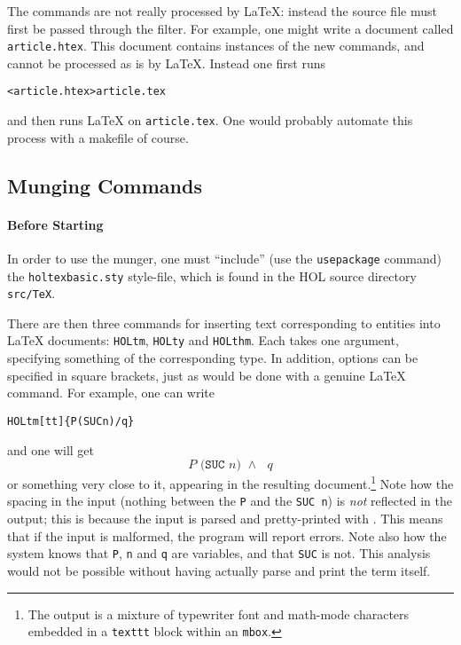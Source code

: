 The commands are not really processed by \LaTeX{}: instead the source file must first be passed through the \munge{} filter.
%
For example, one might write a document called \texttt{article.htex}.
%
This document contains instances of the new commands, and cannot be processed as is by \LaTeX{}.
%
Instead one first runs
\begin{alltt}
   \munge < article.htex > article.tex
\end{alltt}
and then runs \LaTeX{} on \texttt{article.tex}.
%
One would probably automate this process with a makefile of course.

\subsection{Munging Commands}
\label{sec:munging-commands}
\newcommand{\holtm}{\texttt{\bs{}HOLtm}}
\newcommand{\holty}{\texttt{\bs{}HOLty}}
\newcommand{\holthm}{\texttt{\bs{}HOLthm}}
\paragraph{Before Starting} In order to use the munger, one must ``include'' (use the \texttt{\bs{}usepackage} command) the \texttt{holtexbasic.sty} style-file, which is found in the HOL source directory \texttt{src/TeX}.

\bigskip
There are then three commands for inserting text corresponding to \HOL{} entities into \LaTeX{} documents: \holtm, \holty{} and \holthm.
%
Each takes one argument, specifying something of the corresponding \HOL{} type.
%
In addition, options can be specified in square brackets, just as would be done with a genuine \LaTeX{} command.
%
For example, one can write
\begin{alltt}
   \holtm{}[tt]\{P(SUC n) /\bs{} q\}
\end{alltt}
and one will get \[
  \texttt{$P$ (SUC $n$) $\land$ $q$}
\]
or something very close to it, appearing in the resulting document.\footnote{The output is a mixture of typewriter font and math-mode characters embedded in a \texttt{\bs{}texttt} block within an \texttt{\bs{}mbox}.}
%
Note how the spacing in the input (nothing between the \texttt{P} and the \texttt{SUC n}) is \emph{not} reflected in the output; this is because the input is parsed and pretty-printed with \HOL{}.
%
This means that if the \HOL{} input is malformed, the \munge{} program will report errors.
%
Note also how the system knows that \texttt{P}, \texttt{n} and \texttt{q} are variables, and that \texttt{SUC} is not.
%
This analysis would not be possible without having \HOL{} actually parse and print the term itself.

